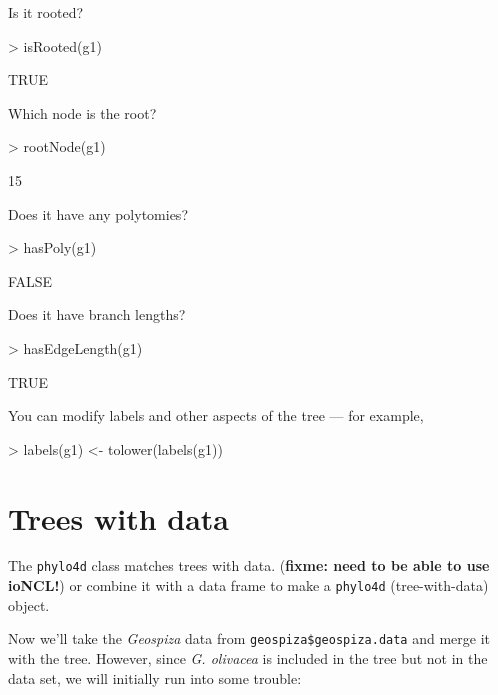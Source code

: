 \documentclass{article}
\newcommand{\code}[1]{{{\tt #1}}}
\begin{document}
Is it rooted?
\begin{Schunk}
\begin{Sinput}
> isRooted(g1)
\end{Sinput}
\begin{Soutput}
[1] TRUE
\end{Soutput}
\end{Schunk}

Which node is the root?
\begin{Schunk}
\begin{Sinput}
> rootNode(g1)
\end{Sinput}
\begin{Soutput}
[1] 15
\end{Soutput}
\end{Schunk}

Does it have any polytomies?
\begin{Schunk}
\begin{Sinput}
> hasPoly(g1)
\end{Sinput}
\begin{Soutput}
[1] FALSE
\end{Soutput}
\end{Schunk}

Does it have branch lengths?
\begin{Schunk}
\begin{Sinput}
> hasEdgeLength(g1)
\end{Sinput}
\begin{Soutput}
[1] TRUE
\end{Soutput}
\end{Schunk}

You can modify labels and other aspects
of the tree --- for example,
\begin{Schunk}
\begin{Sinput}
> labels(g1) <- tolower(labels(g1))
\end{Sinput}
\end{Schunk}

\section{Trees with data}

The \code{phylo4d} class matches trees with data.
(\textbf{fixme: need to be able to use ioNCL!})
or combine it with a data frame to make a \code{phylo4d} (tree-with-data)
object.

Now we'll take the \emph{Geospiza} data from \verb+geospiza$geospiza.data+
and merge it with the tree.  However, since \emph{G. olivacea} is included
in the tree but not in the data set, we will initially run into some trouble:
\end{document}
